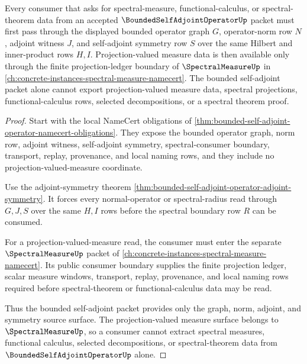 \begin{theorem}
\label{thm:bounded-self-adjoint-spectral-measure-consumer-boundary}
Every consumer that asks for spectral-measure, functional-calculus, or spectral-theorem data from an accepted $\BoundedSelfAdjointOperatorUp$ packet must first pass through the displayed bounded operator graph $G$, operator-norm row $N$, adjoint witness $J$, and self-adjoint symmetry row $S$ over the same Hilbert and inner-product rows $H,I$. Projection-valued measure data is then available only through the finite projection-ledger boundary of $\SpectralMeasureUp$ in \autoref{ch:concrete-instances-spectral-measure-namecert}. The bounded self-adjoint packet alone cannot export projection-valued measure data, spectral projections, functional-calculus rows, selected decompositions, or a spectral theorem proof.
\end{theorem}
\begin{proof}
Start with the local NameCert obligations of \autoref{thm:bounded-self-adjoint-operator-namecert-obligations}. They expose the bounded operator graph, norm row, adjoint witness, self-adjoint symmetry, spectral-consumer boundary, transport, replay, provenance, and local naming rows, and they include no projection-valued-measure coordinate.

Use the adjoint-symmetry theorem \autoref{thm:bounded-self-adjoint-operator-adjoint-symmetry}. It forces every normal-operator or spectral-radius read through $G,J,S$ over the same $H,I$ rows before the spectral boundary row $R$ can be consumed.

For a projection-valued-measure read, the consumer must enter the separate $\SpectralMeasureUp$ packet of \autoref{ch:concrete-instances-spectral-measure-namecert}. Its public consumer boundary supplies the finite projection ledger, scalar measure windows, transport, replay, provenance, and local naming rows required before spectral-theorem or functional-calculus data may be read.

Thus the bounded self-adjoint packet provides only the graph, norm, adjoint, and symmetry source surface. The projection-valued measure surface belongs to $\SpectralMeasureUp$, so a consumer cannot extract spectral measures, functional calculus, selected decompositions, or spectral-theorem data from $\BoundedSelfAdjointOperatorUp$ alone.
\end{proof}

